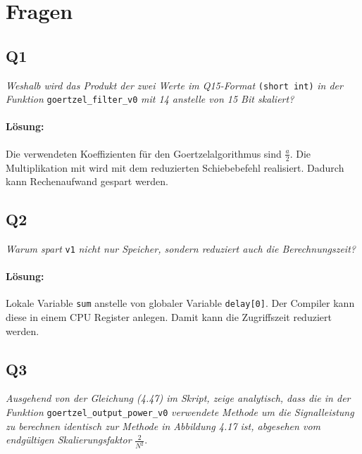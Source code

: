 \documentclass[a4,paper,fleqn]{article}
\begin{document}
\clearpage

\section{Fragen}

\subsection{Q1}
\label{q1}
\emph{Weshalb wird das Produkt der zwei Werte im Q15-Format}
\verb?(short int)?
\emph{in der Funktion}
\verb?goertzel_filter_v0?
\emph{mit 14 anstelle von 15 Bit skaliert? }
\paragraph{Lösung: }
Die verwendeten Koeffizienten für den Goertzelalgorithmus sind $\frac{a}{2}$. 
Die Multiplikation mit wird mit dem reduzierten Schiebebefehl realisiert. 
Dadurch kann Rechenaufwand gespart werden. 
\subsection{Q2}
\label{q2}
\emph{Warum spart}
\verb?v1?
\emph{nicht nur Speicher, sondern reduziert auch die 
Berechnungszeit?}
\paragraph{Lösung: }
Lokale Variable \verb?sum? anstelle von globaler Variable \verb?delay[0]?. Der 
Compiler kann diese in einem CPU Register anlegen. Damit kann die Zugriffszeit 
reduziert werden. 

\subsection{Q3}
\label{q3}
\emph{Ausgehend von der Gleichung (4.47) im Skript, zeige analytisch, dass die 
in der Funktion}
\verb?goertzel_output_power_v0?
\emph{verwendete Methode um die Signalleistung zu berechnen identisch zur 
Methode in Abbildung 4.17 ist, abgesehen vom endgültigen Skalierungsfaktor}
$\frac{2}{N^2}$.
\end{document}
